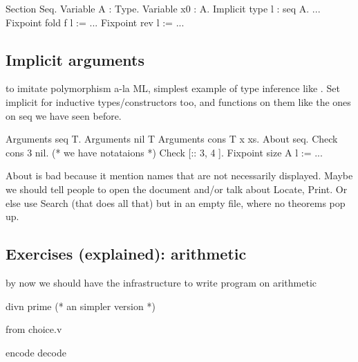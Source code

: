 \begin{coq}{}
Section Seq.
Variable A : Type.
Variable x0 : A.
Implicit type l : seq A.
...
Fixpoint fold f l := ...
Fixpoint rev l := ...
\end{coq}


\subsection{Implicit arguments}
to imitate polymorphism a-la ML, simplest example of type inference
like .  Set implicit for inductive types/constructors too,
and functions on them like the ones on seq we have seen before.

\begin{coq}{}
Arguments seq {T}.
Arguments nil {T}
Arguments cons {T} x xs.
About seq.
Check cons 3 nil.
(* we have notataions *)
Check [:: 3, 4 ].
Fixpoint size A l := ...
\end{coq}

About is bad because it mention names that are not necessarily displayed.
Maybe we should tell people to open the document and/or talk about Locate,
Print.  Or else use Search (that does all that) but in an empty
file, where no theorems pop up.

\subsection{Exercises (explained): arithmetic}
by now we should have the infrastructure to write program on arithmetic

\begin{coq}{}
divn
prime  (* an simpler version *)
\end{coq}

from choice.v

\begin{coq}{}
encode
decode
\end{coq}
